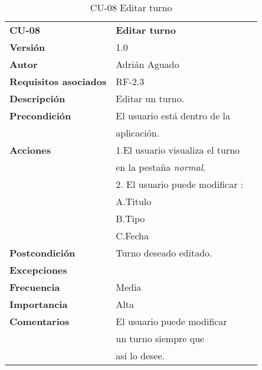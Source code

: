 \begin{table}[H]
\begin{tabular}{llr}  
\toprule
\begin{minipage}[b]{0.24\columnwidth}\raggedright\strut
\textbf{CU-08}\strut
\end{minipage} & \begin{minipage}[b]{0.72\columnwidth}\raggedright\strut
\textbf{Editar turno}\strut
\end{minipage}\tabularnewline
\cmidrule(r){1-2}
\textbf{Versión}       & 1.0           \\
\textbf{Autor}       & Adrián  Aguado    \\
\textbf{Requisitos asociados}       & RF-2.3 \\ 
\textbf{Descripción} & Editar un turno.\\
\textbf{Precondición} & El usuario está dentro de la \\
& aplicación. \\
\textbf{Acciones} & 1.El usuario visualiza el turno  \\
& en la pestaña  \emph{normal}. \\
& 2. El usuario puede modificar :      \\
& A.Titulo \\
& B.Tipo \\
& C.Fecha\\
\textbf{Postcondición} & Turno deseado editado.\\
\textbf{Excepciones} &     \\
\textbf{Frecuencia} & Media          \\
\textbf{Importancia} & Alta            \\
\textbf{Comentarios } &    El usuario puede modificar  \\
&  un turno siempre que  \\
&  así lo desee.  \\
\bottomrule
\end{tabular}
\caption{CU-08 Editar turno} 
\end{table}

